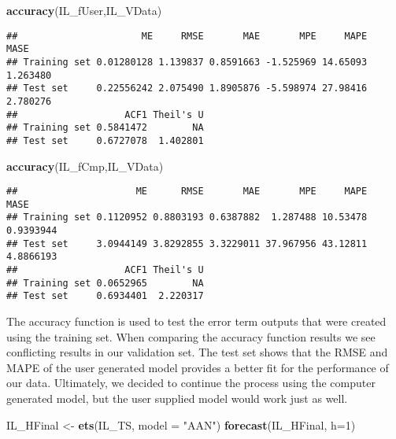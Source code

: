 \documentclass[
]{article}
\newenvironment{Shaded}{\begin{snugshade}}{\end{snugshade}}
\newcommand{\DataTypeTok}[1]{\textcolor[rgb]{0.13,0.29,0.53}{#1}}
\newcommand{\DecValTok}[1]{\textcolor[rgb]{0.00,0.00,0.81}{#1}}
\newcommand{\KeywordTok}[1]{\textcolor[rgb]{0.13,0.29,0.53}{\textbf{#1}}}
\newcommand{\NormalTok}[1]{#1}
\newcommand{\StringTok}[1]{\textcolor[rgb]{0.31,0.60,0.02}{#1}}
\begin{document}
\begin{Shaded}
\begin{Highlighting}[]
\KeywordTok{accuracy}\NormalTok{(IL_fUser,IL_VData)}
\end{Highlighting}
\end{Shaded}

\begin{verbatim}
##                      ME     RMSE       MAE       MPE     MAPE     MASE
## Training set 0.01280128 1.139837 0.8591663 -1.525969 14.65093 1.263480
## Test set     0.22556242 2.075490 1.8905876 -5.598974 27.98416 2.780276
##                   ACF1 Theil's U
## Training set 0.5841472        NA
## Test set     0.6727078  1.402801
\end{verbatim}

\begin{Shaded}
\begin{Highlighting}[]
\KeywordTok{accuracy}\NormalTok{(IL_fCmp,IL_VData)}
\end{Highlighting}
\end{Shaded}

\begin{verbatim}
##                     ME      RMSE       MAE       MPE     MAPE      MASE
## Training set 0.1120952 0.8803193 0.6387882  1.287488 10.53478 0.9393944
## Test set     3.0944149 3.8292855 3.3229011 37.967956 43.12811 4.8866193
##                   ACF1 Theil's U
## Training set 0.0652965        NA
## Test set     0.6934401  2.220317
\end{verbatim}

The accuracy function is used to test the error term outputs that were
created using the training set. When comparing the accuracy function
results we see conflicting results in our validation set. The test set
shows that the RMSE and MAPE of the user generated model provides a
better fit for the performance of our data. Ultimately, we decided to
continue the process using the computer generated model, but the user
supplied model would work just as well.

\begin{Shaded}
\begin{Highlighting}[]
\NormalTok{IL_HFinal <-}\StringTok{ }\KeywordTok{ets}\NormalTok{(IL_TS, }\DataTypeTok{model =} \StringTok{"AAN"}\NormalTok{)}
\KeywordTok{forecast}\NormalTok{(IL_HFinal, }\DataTypeTok{h=}\DecValTok{1}\NormalTok{)}
\end{Highlighting}
\end{Shaded}
\end{document}
